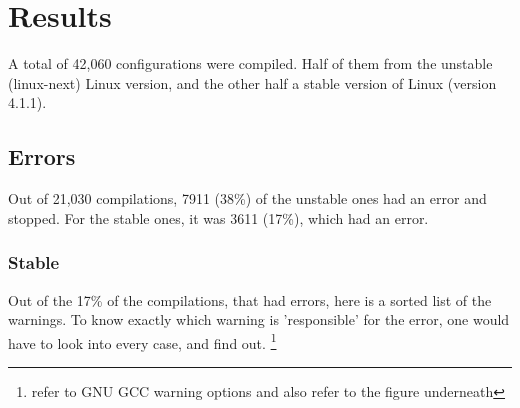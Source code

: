 \documentclass[a4paper,11pt]{report}
\begin{document}
\chapter{Results}

A total of 42,060 configurations were compiled. Half of them from the unstable 
(linux-next) Linux version, and the other half a stable version of Linux 
(version 4.1.1).

    \section{Errors}

Out of 21,030 compilations, 7911 (38\%) of the unstable ones had an error and 
stopped. For the stable ones, it was 3611 (17\%), which had an error.

    \subsection{Stable}

Out of the 17\% of the compilations, that had errors, here is a sorted list of 
the warnings. To know exactly which warning is 'responsible' for the error, 
one would have to look into every case, and find out.
    \footnote{refer to GNU GCC warning options and also refer to the figure 
        underneath}
\end{document}
